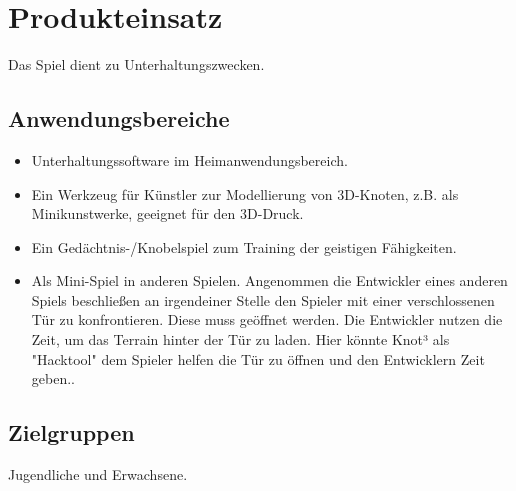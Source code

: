 \chapter{Produkteinsatz}

Das Spiel dient zu Unterhaltungszwecken.

\section{Anwendungsbereiche}


\begin{itemize}

	\item Unterhaltungssoftware im Heimanwendungsbereich. 
	
	\item Ein Werkzeug für Künstler zur Modellierung von 3D-Knoten, z.B. als Minikunstwerke, geeignet für den 3D-Druck.
	
	\item Ein Gedächtnis-/Knobelspiel zum Training der
	geistigen Fähigkeiten.
	
	\item Als Mini-Spiel in anderen Spielen. Angenommen die Entwickler eines anderen Spiels beschließen
	an irgendeiner  Stelle den Spieler mit einer verschlossenen Tür zu konfrontieren. Diese muss
	geöffnet werden. Die Entwickler nutzen die Zeit, um das Terrain hinter der Tür zu laden. Hier könnte
	Knot³ als "Hacktool" dem Spieler helfen die Tür zu öffnen und den Entwicklern Zeit geben..
	
	
\end{itemize}

\section{Zielgruppen}

Jugendliche und Erwachsene.





